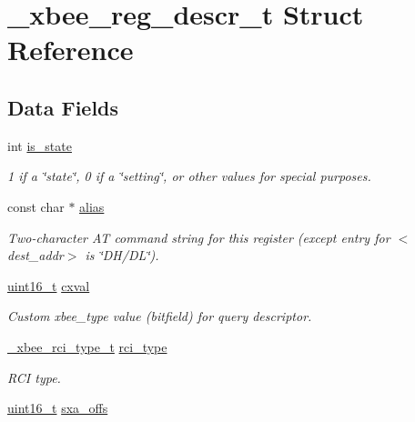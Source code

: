 \hypertarget{struct__xbee__reg__descr__t}{\section{\-\_\-xbee\-\_\-reg\-\_\-descr\-\_\-t Struct Reference}
\label{struct__xbee__reg__descr__t}
}
\subsection*{Data Fields}
\begin{DoxyCompactItemize}
\item 
int \hyperlink{struct__xbee__reg__descr__t_ad94e63af9aef7b2c583788852ebdc5b1}{is\-\_\-state}
\begin{DoxyCompactList}\small\item\em 1 if a \char`\"{}state\char`\"{}, 0 if a \char`\"{}setting\char`\"{}, or other values for special purposes. \end{DoxyCompactList}\item 
const char $\ast$ \hyperlink{struct__xbee__reg__descr__t_aae877041546563a319dff9e25bc3aaf7}{alias}
\begin{DoxyCompactList}\small\item\em Two-\/character A\-T command string for this register (except entry for $<$dest\-\_\-addr$>$ is \char`\"{}\-D\-H/\-D\-L\char`\"{}). \end{DoxyCompactList}\item 
\hyperlink{group__hal_ga5a8b2dc9e45a9ee81a94ef304fb62505}{uint16\-\_\-t} \hyperlink{struct__xbee__reg__descr__t_aa89979f0cabc914d3df82120cb9aa1a4}{cxval}
\begin{DoxyCompactList}\small\item\em Custom xbee\-\_\-type value (bitfield) for query descriptor. \end{DoxyCompactList}\item 
\hypertarget{struct__xbee__reg__descr__t_a7ae80afc0da97444432fc11aadbcb52d}{\hyperlink{group__xbee__atcmd_gaa874b4a291f79f2e80f867ce71fccea5}{\-\_\-xbee\-\_\-rci\-\_\-type\-\_\-t} \hyperlink{struct__xbee__reg__descr__t_a7ae80afc0da97444432fc11aadbcb52d}{rci\-\_\-type}}\label{struct__xbee__reg__descr__t_a7ae80afc0da97444432fc11aadbcb52d}

\begin{DoxyCompactList}\small\item\em R\-C\-I type. \end{DoxyCompactList}\item 
\hypertarget{struct__xbee__reg__descr__t_acfa39348dc06ee8b25af49145a003e23}{\hyperlink{group__hal_ga5a8b2dc9e45a9ee81a94ef304fb62505}{uint16\-\_\-t} \hyperlink{struct__xbee__reg__descr__t_acfa39348dc06ee8b25af49145a003e23}{sxa\-\_\-offs}}\label{struct__xbee__reg__descr__t_acfa39348dc06ee8b25af49145a003e23}


\end{DoxyCompactItemize}
